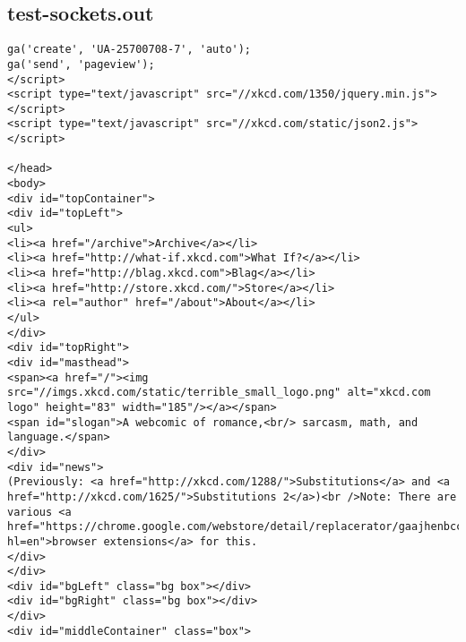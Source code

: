 \subsection{test-sockets.out}
\begin{lstlisting}
ga('create', 'UA-25700708-7', 'auto');
ga('send', 'pageview');
</script>
<script type="text/javascript" src="//xkcd.com/1350/jquery.min.js"></script>
<script type="text/javascript" src="//xkcd.com/static/json2.js"></script>

</head>
<body>
<div id="topContainer">
<div id="topLeft">
<ul>
<li><a href="/archive">Archive</a></li>
<li><a href="http://what-if.xkcd.com">What If?</a></li>
<li><a href="http://blag.xkcd.com">Blag</a></li>
<li><a href="http://store.xkcd.com/">Store</a></li>
<li><a rel="author" href="/about">About</a></li>
</ul>
</div>
<div id="topRight">
<div id="masthead">
<span><a href="/"><img src="//imgs.xkcd.com/static/terrible_small_logo.png" alt="xkcd.com logo" height="83" width="185"/></a></span>
<span id="slogan">A webcomic of romance,<br/> sarcasm, math, and language.</span>
</div>
<div id="news">
(Previously: <a href="http://xkcd.com/1288/">Substitutions</a> and <a href="http://xkcd.com/1625/">Substitutions 2</a>)<br />Note: There are various <a href="https://chrome.google.com/webstore/detail/replacerator/gaajhenbcclienfnniphiiambbbninnp?hl=en">browser extensions</a> for this.
</div>
</div>
<div id="bgLeft" class="bg box"></div>
<div id="bgRight" class="bg box"></div>
</div>
<div id="middleContainer" class="box">


\end{lstlisting}
